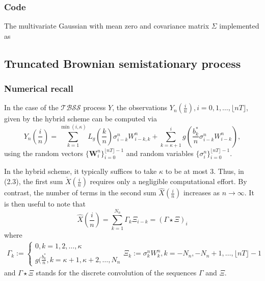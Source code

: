 \documentclass[12pt]{article}
\numberwithin{equation}{section}
\begin{document}
      \subsubsection{Code}
        The multivariate Gaussian with mean zero and covariance matrix $\Sigma$ implemented as 

  \subsection{Truncated Brownian semistationary process}
      \subsubsection{Numerical recall}
    
      In the case of the $\mathcal{TBSS}$ process $Y$, the observations $Y_n(\frac{i}{n}), i=0,1,\dots,\lfloor nT \rfloor$, given by the hybrid scheme can be computed via
      \begin{equation}
        Y_n(\frac{i}{n}) = \sum_{k=1}^{\min(i,\kappa)}L_g(\frac{k}{n})\sigma_{i-k}^nW_{i-k,k}^n + \sum_{k=\kappa+1}^{i} g(\frac{b_k^*}{n}\sigma_{i-k}^nW_{i-k}^n),
      \end{equation}
      using the random vectors $\{\bm{W}_i^n\}_{i=0}^{\lfloor nT \rfloor-1}$ and random variables $\{\sigma_i^n\}_{i=0}^{\lfloor nT\rfloor-1}$.

      In the hybrid scheme, it typically suffices to take $\kappa$ to be at most 3. Thus, in (2.3), the first sum $\check{X}(\frac{i}{n})$ requires only a negligible computational effort. By contrast, the number of terms in the second sum $\hat{X}(\frac{i}{n})$ increases as $n\rightarrow\infty$. It is then useful to note that
      \begin{equation}
        \hat{X}(\frac{i}{n}) = \sum_{k=1}^{N_n} \Gamma_k \Xi_{i-k} = (\Gamma\star\Xi)_i
      \end{equation}
      where
      \begin{equation}
        \begin{split}
          \Gamma_k := \begin{cases}
            0, k=1,2,\dots,\kappa \\
            g(\frac{b_k^*}{n}, k = \kappa+1,\kappa+2,\dots,N_n
          \end{cases}
          \Xi_k := \sigma_k^nW_k^n, k = -N_n, -N_n+1, \dots, \lfloor nT \rfloor - 1
        \end{split}
      \end{equation}
      and $\Gamma\star\Xi$ stands for the discrete convolution of the sequences $\Gamma$ and $\Xi$.
      
\end{document}
